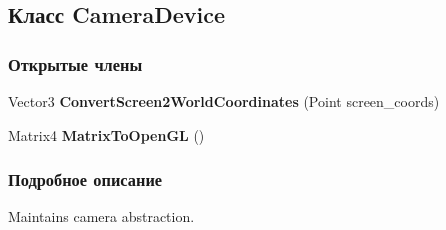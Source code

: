 \subsection{Класс Camera\+Device}
\label{class_win_form_animation2_d_1_1_camera_device}
\subsubsection*{Открытые члены}
\begin{DoxyCompactItemize}
\item 
Vector3 {\bf Convert\+Screen2\+World\+Coordinates} (Point screen\+\_\+coords)\label{class_win_form_animation2_d_1_1_camera_device_ac7ad419940551e2a63d36549481ff424}

\item 
Matrix4 {\bf Matrix\+To\+Open\+GL} ()\label{class_win_form_animation2_d_1_1_camera_device_a708b9cba847463c03fc39aa0e6a8e51b}

\end{DoxyCompactItemize}


\subsubsection{Подробное описание}
Maintains camera abstraction. 

